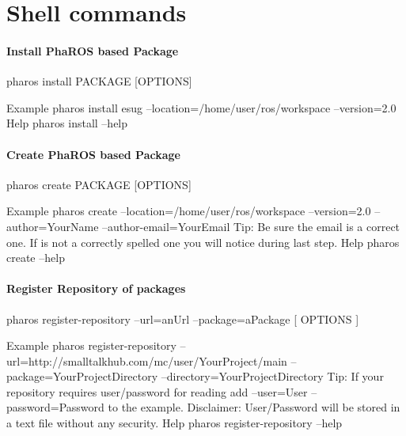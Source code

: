 \documentclass[a4paper,10pt,twoside]{book}
\begin{document}
	\section{Shell commands}
	
	\paragraph{Install PhaROS based Package\newline}

		pharos install PACKAGE [OPTIONS]\newline
		
		Example \newline
			\-\-pharos install esug --location=/home/user/ros/workspace --version=2.0\newline
		Help 
			\-\-pharos install --help\newline

	\paragraph {Create PhaROS based Package\newline}

		pharos create PACKAGE [OPTIONS]\newline
		
		Example\newline
			\-\-pharos create --location=/home/user/ros/workspace --version=2.0 --author=YourName --author-email=YourEmail \newline
			\-\-Tip: Be sure the email is a correct one. If is not a correctly spelled one you will notice during last step. \newline
		Help \newline
			\-\-pharos create --help\newline
		
		
		
	\paragraph{Register Repository of packages  \newline}
	
		pharos register-repository --url=anUrl --package=aPackage [ OPTIONS ]\newline
		
		Example \newline
			\-\-pharos register-repository --url=http://smalltalkhub.com/mc/user/YourProject/main --package=YourProjectDirectory --directory=YourProjectDirectory \newline
			\-\-Tip: If your repository requires user/password for reading add --user=User --password=Password to the example. \newline
			\-\-Disclaimer: User/Password will be stored in a text file without any security. \newline
		Help 
			\-\-pharos register-repository --help\newline
		
\end{document}
